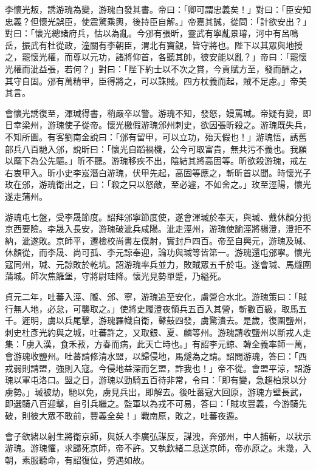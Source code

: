 \begin{pinyinscope}
 李懷光叛，誘游瑰為變，游瑰白發其書。帝曰：「卿可謂忠義矣！」對曰：「臣安知忠義？但懷光誤臣，使震驚乘輿，後持臣自解。」帝嘉其誠，從問：「計欲安出？」對曰：「懷光總諸府兵，怙以為亂。今邠有張昕，靈武有寧薍景璿，河中有呂鳴岳，振武有杜從政，潼關有李朝臣，渭北有竇覦，皆守將也。陛下以其眾與地授之，罷懷光權，而尊以元功，諸將仰首，各聽其帥，彼安能以亂？」帝曰：「罷懷光權而泚益張，若何？」對曰：「陛下約士以不次之賞，今貢賦方至，發而酬之，其守自固。邠有萬精甲，臣得將之，可以誅賊。四方杖義而起，賊不足慮。」帝美其言。



 會懷光誘復至，渾瑊得書，稍嚴卒以警。游瑰不知，發怒，嫚罵瑊。帝疑有變，即日幸梁州，游瑰使子從帝。懷光檄假游瑰邠州刺史，欲因張昕殺之。游瑰既失兵，不知所圖。有客劉南金說曰：「邠有留甲，可以立功，殆天假也！」游瑰悟，誘舊部兵八百馳入邠，說昕曰：「懷光自蹈禍機，公今可取富貴，無共污不義也。我願以麾下為公先驅。」昕不聽。游瑰移疾不出，陰結其將高固等。昕欲殺游瑰，戒左右衷甲入。昕小史李岌潛白游瑰，伏甲先起，高固等應之，斬昕首以聞。時懷光子玫在邠，游瑰衛出之，曰：「殺之只以怒敵，至必遽，不如舍之。」玫至涇陽，懷光遂走蒲州。



 游瑰屯七盤，受李晟節度。詔拜邠寧節度使，遂會渾瑊於奉天，與瑊、戴休顏分扼京西要險。李晟入長安，游瑰破泚兵咸陽。泚走涇州，游瑰使諭涇將楊澄，澄拒不納，泚遂敗。京師平，遷檢校尚書左僕射，實封戶四百。帝至自興元，游瑰及瑊、休顏從，而李晟、尚可孤、李元諒奉迎，論功與瑊等皆第一。游瑰還屯邠寧。懷光寇同州，瑊、元諒敗於乾坑。詔游瑰率兵並力，敗賊眾五千於屯。遂會瑊、馬燧圍蒲城。師次焦籬堡，守將尉珪降。懷光見勢單蹙，乃縊死。



 貞元二年，吐蕃入涇、隴、邠、寧，游瑰追至安化，虜營合水北。游瑰策曰：「賊行無人地，必怠，可襲取之。」使將史履澄夜領兵五百入其營，斬數百級，取馬五千。遲明，虜以兵尾擊，游瑰羅幟自衛，鼙鼓四發，虜驚潰去。是歲，復圍鹽州，刺史杜彥光約與之城，吐蕃許之，又取銀、夏、麟等州。游瑰請收鹽州以斷戎人走集：「虜入漢，食禾菽，方春而病，此天亡時也。」有詔李元諒、韓全義率師一萬，會游瑰收鹽州。吐蕃請修清水盟，以歸侵地，馬燧為之請。詔問游瑰，答曰：「西戎弱則請盟，強則入寇。今侵地益深而乞盟，詐我也！」帝不從。會盟平涼，詔游瑰以軍屯洛口。盟之日，游瑰以勁騎五百待非常，令曰：「即有變，急趨柏泉以分虜勢。」瑊被劫，馳以免，虜見兵出，即解去。後吐蕃寇大回原，游瑰方壁長武，即選騎八百迎擊，自引兵繼之。監軍以為戎不可易，答曰：「賊攻豐義，今游騎先破，則彼大眾不敢前，豐義全矣！」戰南原，敗之，吐蕃夜遁。



 會子欽緒以射生將衛京師，與妖人李廣弘謀反，謀洩，奔邠州，中人捕斬，以狀示游瑰。游瑰懼，求歸死京師，帝不許。又執欽緒二息送京師，帝亦原之。未幾，入朝，素服聽命，有詔復位，勞遇如故。




\end{pinyinscope}
